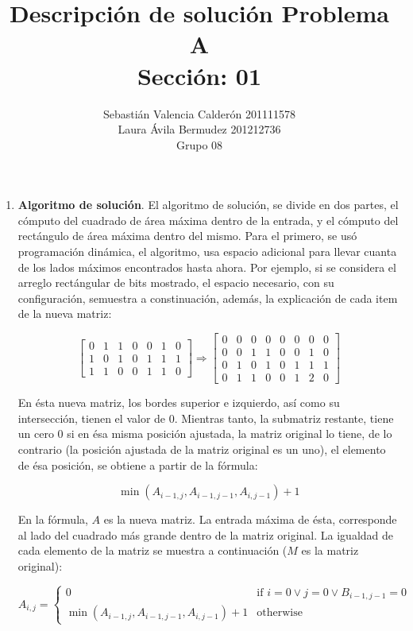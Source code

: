 \documentclass[11pt,spanish]{article}
\title{Descripción de solución Problema A \\
Sección: 01 \\}
\author{Sebastián Valencia Calderón 201111578 \\
  Laura Ávila Bermudez 201212736 \\
  Grupo 08
}
\begin{document}
\maketitle

\begin{enumerate}
	\item \textbf{Algoritmo de solución}. El algoritmo de solución, se divide en dos partes, el cómputo del cuadrado de área máxima dentro de la entrada, y el cómputo del rectángulo de área máxima dentro del mismo. Para el primero, se usó programación dinámica, el algoritmo, usa espacio adicional para llevar cuanta de los lados máximos encontrados hasta ahora. Por ejemplo, si se considera el arreglo rectángular de bits mostrado, el espacio necesario, con su configuración, semuestra a constinuación, además, la explicación de cada item de la nueva matriz: 
	
	\[
\begin{bmatrix}
    0 & 1 & 1 & 0 & 0 & 1 & 0 \\
    1 & 0 & 1 & 0 & 1 & 1 & 1 \\
    1 & 1 & 0 & 0 & 1 & 1 & 0
\end{bmatrix}
\Rightarrow
\begin{bmatrix}
	0 & 0 & 0 & 0 & 0 & 0 & 0 & 0 \\
    0 & 0 & 1 & 1 & 0 & 0 & 1 & 0 \\
    0 & 1 & 0 & 1 & 0 & 1 & 1 & 1 \\
    0 & 1 & 1 & 0 & 0 & 1 & 2 & 0
\end{bmatrix}
\]

En ésta nueva matriz, los bordes superior e izquierdo, así como su intersección, tienen el valor de $0$. Mientras tanto, la submatriz restante, tiene un cero $0$ si en ésa misma posición ajustada, la matriz original lo tiene, de lo contrario (la posición ajustada de la matriz original es un uno), el elemento de ésa posición, se obtiene a partir de la fórmula:

$$\min \left( A_{i - 1, j}, A_{i - 1, j - 1}, A_{i, j - 1}\right) + 1$$

En la fórmula, $A$ es la nueva matriz. La entrada máxima de ésta, corresponde al lado del cuadrado más grande dentro de la matriz original. La igualdad de cada elemento de la matriz se muestra a continuación ($M$ es la matriz original):

\[
 A_{i, j} =
  \begin{cases}
   0 & \text{if } i = 0 \vee j = 0 \vee B_{i - 1, j - 1} = 0  \\
   \min \left( A_{i - 1, j}, A_{i - 1, j - 1}, A_{i, j - 1}\right) + 1       & \text{otherwise }
  \end{cases}
\]


\end{enumerate}
\end{document}
